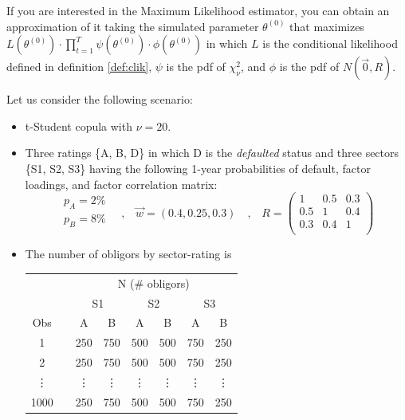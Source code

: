 \documentclass[11pt,fleqn]{book} %
\begin{document}
If you are interested in the Maximum Likelihood estimator, you can obtain an
approximation of it taking the simulated parameter $\theta^{(0)}$ that maximizes
$L(\theta^{(0)}) \cdot \prod_{t=1}^{T} \psi(\theta^{(0)}) \cdot \phi(\theta^{(0)})$ 
in which $L$ is the conditional likelihood defined in definition \ref{def:clik},
$\psi$ is the pdf of $\chi_{\nu}^2$, and $\phi$ is the pdf of $N(\vec{0},R)$.

\begin{example}
	\label{ex:calib}
	Let us consider the following scenario:
	\begin{itemize}
		\item t-Student copula with $\nu=20$.
		\item Three ratings \{A, B, D\} in which D is the \emph{defaulted} status 
		and three sectors \{S1, S2, S3\} having the following 1-year probabilities 
		of default, factor loadings, and factor correlation matrix:
		\begin{displaymath}
			\begin{array}{l}
				p_A=2\%     \\
				p_B=8\%     \\
			\end{array}
			\quad \text{,} \quad
			\vec{w} = (0.4, 0.25, 0.3)
			\quad \text{,} \quad
			R = \left(
			\begin{array}{ccc}
				1 & 0.5 & 0.3 \\
				0.5 & 1 & 0.4 \\
				0.3 & 0.4 & 1 \\
			\end{array}
			\right) 
		\end{displaymath}
		\item The number of obligors by sector-rating is\\
		\newline
		\hspace*{1cm}
		\small
		\begin{tabular}{cc|c|c||c|c||c|c|}
			\cline{3-8}
			& & \multicolumn{6}{|c|}{N (\# obligors)} \\
			\cline{3-8}
			& & \multicolumn{2}{|c||}{S1} & \multicolumn{2}{|c||}{S2} & \multicolumn{2}{|c|}{S3} \\
			\cline{1-1} \cline{3-8}
			\multicolumn{1}{|c|}{Obs} & & A & B & A & B & A & B \\
			\cline{1-1} \cline{3-8}
			\multicolumn{1}{|c|}{1} & & 250 & 750 & 500 & 500 & 750 & 250 \\
			\cline{1-1} \cline{3-8}
			\multicolumn{1}{|c|}{2} & & 250 & 750 & 500 & 500 & 750 & 250 \\
			\cline{1-1} \cline{3-8}
			\multicolumn{1}{|c|}{\vdots} & & \vdots & \vdots & \vdots & \vdots & \vdots & \vdots \\
			\cline{1-1} \cline{3-8}
			\multicolumn{1}{|c|}{1000} & & 250 & 750 & 500 & 500 & 750 & 250 \\
			\cline{1-1} \cline{3-8}
		\end{tabular}
	\end{itemize}
	\vspace{11pt}


\end{example}
\end{document}
